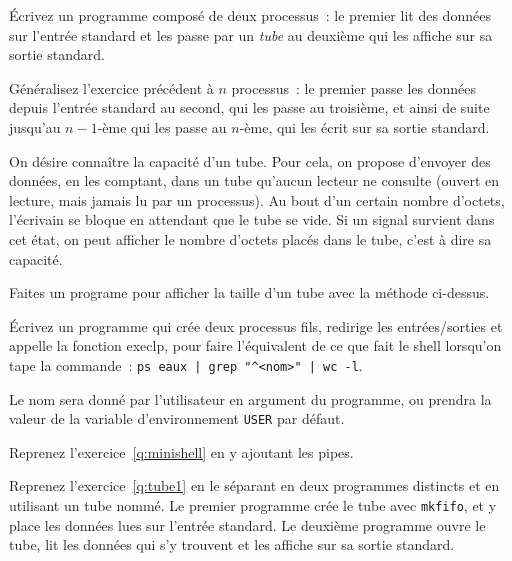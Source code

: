 %


% 


\question
    \label {q:tube1}

Écrivez un programme composé de deux processus~: le
premier lit des données sur l'entrée
standard et les passe par un {\em tube} au deuxième qui les
affiche sur sa sortie standard.


\question

Généralisez l'exercice précédent à $n$ processus~:  le premier passe les
données depuis l'entrée standard au second, qui les passe au troisième,
et ainsi de suite jusqu'au $n-1$-ème qui les passe au $n$-ème, qui les
écrit sur sa sortie standard.


\question

On désire connaître la capacité d'un tube.  Pour cela, on propose
d'envoyer des données, en les comptant, dans un tube qu'aucun lecteur ne
consulte (ouvert en lecture, mais jamais lu par un processus).  Au bout
d'un certain nombre d'octets, l'écrivain se bloque en attendant que le
tube se vide.  Si un signal survient dans cet état, on peut afficher le
nombre d'octets placés dans le tube, c'est à dire sa capacité.

Faites un programe pour afficher la taille d'un tube avec la méthode
ci-dessus.


\question

Écrivez un programme qui crée deux processus fils, redirige les
entrées/sorties et appelle la fonction execlp, pour faire l'équivalent
de ce que fait le shell lorsqu'on tape la commande~: {\tt ps eaux |
grep "\^{ }<nom>" | wc -l}.

Le nom sera donné par l'utilisateur en argument du programme, ou
prendra la valeur de la variable d'environnement {\tt USER} par défaut.

\question

Reprenez l'exercice~\ref {q:minishell} en y ajoutant les pipes.

\question

Reprenez l'exercice~\ref {q:tube1} en le séparant en deux
programmes distincts et en utilisant un tube nommé.  Le premier
programme crée le tube avec {\tt mkfifo}, et y place les données lues
sur l'entrée standard.  Le deuxième programme ouvre le tube, lit les
données qui s'y trouvent et les affiche sur sa sortie standard.


